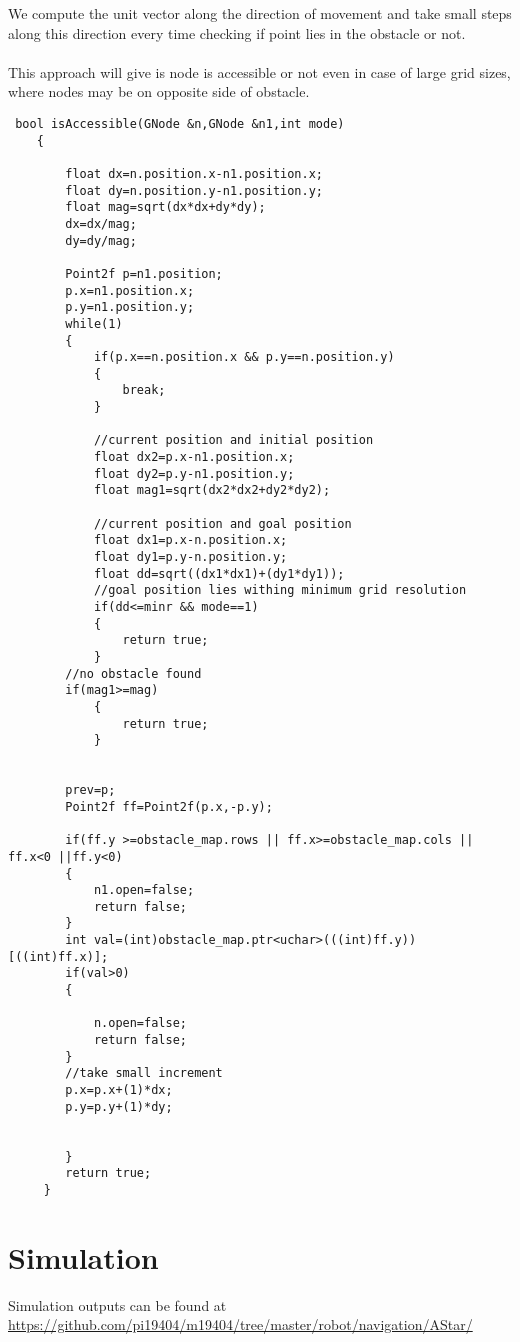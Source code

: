 \documentclass[fontsize=12pt, %
                             paper=a4, %
                             oneside, %
                             captions=tableheading,
                             index=totoc,
                             hyperref]{labbook}
\begin{document}
We compute the unit vector along the direction of movement and take small steps
along this direction every time checking if point lies in the obstacle or not.
\\\\
This approach will give is node is accessible or not even in case of large grid sizes,
where nodes may be on opposite side of obstacle.
\begin{verbatim}
 bool isAccessible(GNode &n,GNode &n1,int mode)
    {

        float dx=n.position.x-n1.position.x;
        float dy=n.position.y-n1.position.y;
        float mag=sqrt(dx*dx+dy*dy);
        dx=dx/mag;
        dy=dy/mag;

        Point2f p=n1.position;
        p.x=n1.position.x;
        p.y=n1.position.y;
        while(1)
        {
            if(p.x==n.position.x && p.y==n.position.y)
            {
                break;
            }

            //current position and initial position
            float dx2=p.x-n1.position.x;
            float dy2=p.y-n1.position.y;
            float mag1=sqrt(dx2*dx2+dy2*dy2);

            //current position and goal position
            float dx1=p.x-n.position.x;
            float dy1=p.y-n.position.y;
            float dd=sqrt((dx1*dx1)+(dy1*dy1));
            //goal position lies withing minimum grid resolution
            if(dd<=minr && mode==1)
            {
                return true;
            }
	    //no obstacle found
	    if(mag1>=mag)
            {
                return true;
            }

            
        prev=p;
        Point2f ff=Point2f(p.x,-p.y);

        if(ff.y >=obstacle_map.rows || ff.x>=obstacle_map.cols || ff.x<0 ||ff.y<0)
        {
            n1.open=false;
            return false;
        }
        int val=(int)obstacle_map.ptr<uchar>(((int)ff.y))[((int)ff.x)];
        if(val>0)
        {

            n.open=false;
            return false;
        }
        //take small increment
        p.x=p.x+(1)*dx;
        p.y=p.y+(1)*dy;
            
            
        }
        return true;
     }
\end{verbatim}
\section{Simulation}
Simulation outputs can be found at
\url{https://github.com/pi19404/m19404/tree/master/robot/navigation/AStar/}
\end{document}
